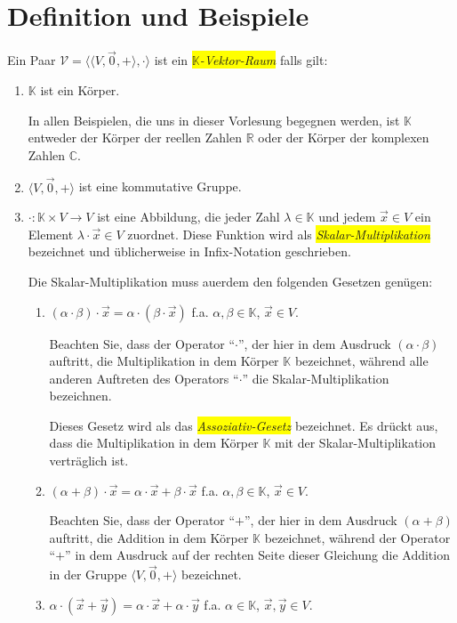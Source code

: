 \section{Definition und Beispiele}
\begin{Definition}
Ein Paar $\mathcal{V} = \bigl\langle \langle V, \vec{0}, + \rangle, \cdot \bigr\rangle$ ist ein
\colorbox{yellow}{\emph{$\mathbb{K}$-Vektor-Raum}} falls gilt:
\begin{enumerate}
\item $\mathbb{K}$ ist ein K\"{o}rper.  

      In allen Beispielen, die uns in dieser Vorlesung begegnen werden,
      ist $\mathbb{K}$ entweder der K\"{o}rper der reellen Zahlen $\mathbb{R}$ oder der K\"{o}rper der komplexen Zahlen $\mathbb{C}$. 
\item $\langle V, \vec{0}, + \rangle$ ist eine kommutative Gruppe.
\item $\cdot: \mathbb{K} \times V \rightarrow V$ ist eine Abbildung, die jeder Zahl $\lambda \in \mathbb{K}$ und jedem 
      $\vec{x} \in V$ ein Element $\lambda \cdot \vec{x} \in V$ zuordnet. 
      Diese Funktion  wird als \colorbox{yellow}{\emph{Skalar-Multiplikation}} bezeichnet und
      \"{u}blicherweise in Infix-Notation geschrieben. 

      Die Skalar-Multiplikation muss au\3erdem den folgenden Gesetzen gen\"{u}gen:
      \begin{enumerate}
      \item $(\alpha \cdot \beta)  \cdot \vec{x} =  \alpha \cdot (\beta \cdot \vec{x})$ \quad f.a.  $\alpha,\beta \in \mathbb{K}$,  $\vec{x} \in V$.

            Beachten Sie, dass der Operator ``$\cdot$'', der hier in dem Ausdruck $(\alpha \cdot \beta)$ auftritt, 
            die Multiplikation in dem K\"{o}rper $\mathbb{K}$ bezeichnet, w\"{a}hrend alle anderen Auftreten des Operators ``$\cdot$'' 
            die Skalar-Multiplikation bezeichnen.  

            Dieses Gesetz wird als das \colorbox{yellow}{\emph{Assoziativ-Gesetz}} bezeichnet.  Es dr\"{u}ckt
            aus, dass die Multiplikation in dem K\"{o}rper $\mathbb{K}$ mit der Skalar-Multiplikation
            vertr\"{a}glich ist.
      \item $(\alpha + \beta) \cdot \vec{x} = \alpha \cdot \vec{x} + \beta \cdot \vec{x}$ \quad f.a.  $\alpha,\beta \in \mathbb{K}$,  $\vec{x} \in V$.

            Beachten Sie, dass der Operator ``$+$'', der  hier in dem Ausdruck $(\alpha + \beta)$
            auftritt, die Addition in dem K\"{o}rper $\mathbb{K}$ bezeichnet, w\"{a}hrend der
            Operator ``$+$'' in dem Ausdruck auf der rechten Seite dieser Gleichung die 
            Addition in der Gruppe $\langle V, \vec{0}, + \rangle$ bezeichnet.  
      \item $\alpha \cdot (\vec{x} + \vec{y}) = \alpha \cdot \vec{x} + \alpha \cdot \vec{y}$ \quad f.a. $\alpha \in \mathbb{K}$,  $\vec{x}, \vec{y} \in V$.


\end{enumerate}
\end{enumerate}
\end{Definition}
